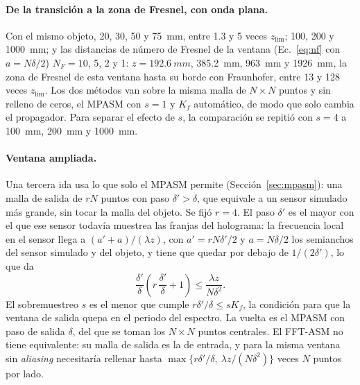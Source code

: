 \paragraph{De la transición a la zona de Fresnel, con onda plana.} Con el
mismo objeto, 20, 30, 50 y \SI{75}{mm}, entre 1.3 y 5 veces
$z_\mathrm{lim}$; 100, 200 y \SI{1000}{mm}; y las distancias de número de
Fresnel de la ventana (Ec.~\eqref{eq:nf} con $a = N\delta/2$) $N_F = 10$, 5,
2 y 1: $z = \SI{192.6}{mm}$, \SI{385.2}{mm}, \SI{963}{mm} y \SI{1926}{mm}, la
zona de Fresnel de esta ventana hasta su borde con Fraunhofer, entre 13 y 128
veces $z_\mathrm{lim}$. Los dos métodos van sobre la misma malla de
$N\times N$ puntos y sin relleno de ceros, el MPASM con $s = 1$ y $K_f$
automático, de modo que solo cambia el propagador. Para separar el efecto de
$s$, la comparación se repitió con $s = 4$ a \SI{100}{mm}, \SI{200}{mm} y
\SI{1000}{mm}.

\paragraph{Ventana ampliada.} Una tercera ida usa lo que solo el MPASM permite
(Sección~\ref{sec:mpasm}): una malla de salida de $rN$ puntos con paso
$\delta' > \delta$, que equivale a un sensor simulado más grande, sin tocar la
malla del objeto. Se fijó $r = 4$. El paso $\delta'$ es el mayor con el que ese
sensor todavía muestrea las franjas del holograma: la frecuencia local en el
sensor llega a $(a' + a)/(\lambda z)$, con $a' = rN\delta'/2$ y $a = N\delta/2$
los semianchos del sensor simulado y del objeto, y tiene que quedar por debajo
de $1/(2\delta')$, lo que da
\begin{equation}
  \frac{\delta'}{\delta}\left(r\,\frac{\delta'}{\delta} + 1\right) \le
  \frac{\lambda z}{N\delta^2}.
  \label{eq:paso-ampliado}
\end{equation}
El sobremuestreo $s$ es el menor que cumple $r\delta'/\delta \le sK_f$, la
condición para que la ventana de salida quepa en el periodo del espectro. La
vuelta es el MPASM con paso de salida $\delta$, del que se toman los
$N\times N$ puntos centrales. El FFT-ASM no tiene equivalente: su malla de
salida es la de entrada, y para la misma ventana sin \emph{aliasing}
necesitaría rellenar hasta $\max\{r\delta'/\delta,\ \lambda z/(N\delta^2)\}$
veces $N$ puntos por lado.

